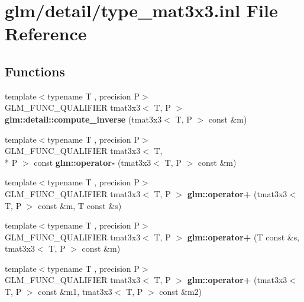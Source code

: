 \hypertarget{type__mat3x3_8inl}{\section{glm/detail/type\-\_\-mat3x3.inl File Reference}
\label{type__mat3x3_8inl}
}
\subsection*{Functions}
\begin{DoxyCompactItemize}
\item 
\hypertarget{namespaceglm_1_1detail_a1dd00ec9765b576b81c8b789a93895a6}{{\footnotesize template$<$typename T , precision P$>$ }\\G\-L\-M\-\_\-\-F\-U\-N\-C\-\_\-\-Q\-U\-A\-L\-I\-F\-I\-E\-R tmat3x3$<$ T, P $>$ {\bfseries glm\-::detail\-::compute\-\_\-inverse} (tmat3x3$<$ T, P $>$ const \&m)}\label{namespaceglm_1_1detail_a1dd00ec9765b576b81c8b789a93895a6}

\item 
\hypertarget{namespaceglm_a084d2675ea3b2effde4e658382fc0240}{{\footnotesize template$<$typename T , precision P$>$ }\\G\-L\-M\-\_\-\-F\-U\-N\-C\-\_\-\-Q\-U\-A\-L\-I\-F\-I\-E\-R tmat3x3$<$ T, \\*
P $>$ const {\bfseries glm\-::operator-\/} (tmat3x3$<$ T, P $>$ const \&m)}\label{namespaceglm_a084d2675ea3b2effde4e658382fc0240}

\item 
\hypertarget{namespaceglm_ab67a7995bbbd541ccbc3cb8383422093}{{\footnotesize template$<$typename T , precision P$>$ }\\G\-L\-M\-\_\-\-F\-U\-N\-C\-\_\-\-Q\-U\-A\-L\-I\-F\-I\-E\-R tmat3x3$<$ T, P $>$ {\bfseries glm\-::operator+} (tmat3x3$<$ T, P $>$ const \&m, T const \&s)}\label{namespaceglm_ab67a7995bbbd541ccbc3cb8383422093}

\item 
\hypertarget{namespaceglm_a440f3185654f2ff02629dd7325127671}{{\footnotesize template$<$typename T , precision P$>$ }\\G\-L\-M\-\_\-\-F\-U\-N\-C\-\_\-\-Q\-U\-A\-L\-I\-F\-I\-E\-R tmat3x3$<$ T, P $>$ {\bfseries glm\-::operator+} (T const \&s, tmat3x3$<$ T, P $>$ const \&m)}\label{namespaceglm_a440f3185654f2ff02629dd7325127671}

\item 
\hypertarget{namespaceglm_a356ed6fa88f4ee6805c31b33ad9e4cd7}{{\footnotesize template$<$typename T , precision P$>$ }\\G\-L\-M\-\_\-\-F\-U\-N\-C\-\_\-\-Q\-U\-A\-L\-I\-F\-I\-E\-R tmat3x3$<$ T, P $>$ {\bfseries glm\-::operator+} (tmat3x3$<$ T, P $>$ const \&m1, tmat3x3$<$ T, P $>$ const \&m2)}\label{namespaceglm_a356ed6fa88f4ee6805c31b33ad9e4cd7}


\end{DoxyCompactItemize}
